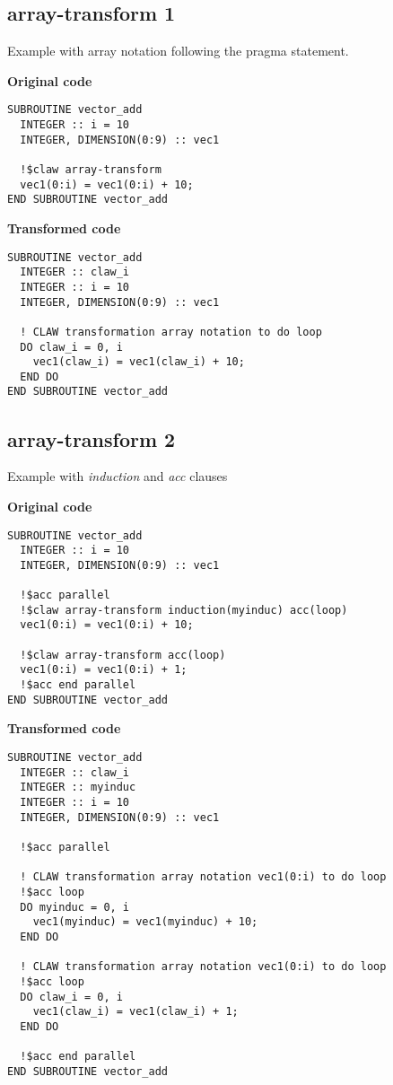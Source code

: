 \documentclass{article}
\begin{document}
\subsection{array-transform 1}
\label{array-transform1}
Example with array notation following the pragma statement. 

\textbf{Original code}
\begin{lstlisting}
SUBROUTINE vector_add
  INTEGER :: i = 10
  INTEGER, DIMENSION(0:9) :: vec1

  !$claw array-transform
  vec1(0:i) = vec1(0:i) + 10;
END SUBROUTINE vector_add
\end{lstlisting}

\textbf{Transformed code}
\begin{lstlisting}
SUBROUTINE vector_add
  INTEGER :: claw_i
  INTEGER :: i = 10
  INTEGER, DIMENSION(0:9) :: vec1

  ! CLAW transformation array notation to do loop
  DO claw_i = 0, i
    vec1(claw_i) = vec1(claw_i) + 10;
  END DO
END SUBROUTINE vector_add
\end{lstlisting}


\subsection{array-transform 2}
\label{array-transform2}
Example with \textit{induction} and \textit{acc} clauses

\textbf{Original code}
\begin{lstlisting}
SUBROUTINE vector_add
  INTEGER :: i = 10
  INTEGER, DIMENSION(0:9) :: vec1

  !$acc parallel
  !$claw array-transform induction(myinduc) acc(loop)
  vec1(0:i) = vec1(0:i) + 10;

  !$claw array-transform acc(loop)
  vec1(0:i) = vec1(0:i) + 1;
  !$acc end parallel
END SUBROUTINE vector_add
\end{lstlisting}


\textbf{Transformed code}
\begin{lstlisting}
SUBROUTINE vector_add
  INTEGER :: claw_i
  INTEGER :: myinduc
  INTEGER :: i = 10
  INTEGER, DIMENSION(0:9) :: vec1

  !$acc parallel

  ! CLAW transformation array notation vec1(0:i) to do loop
  !$acc loop
  DO myinduc = 0, i
    vec1(myinduc) = vec1(myinduc) + 10;
  END DO

  ! CLAW transformation array notation vec1(0:i) to do loop
  !$acc loop
  DO claw_i = 0, i
    vec1(claw_i) = vec1(claw_i) + 1;
  END DO
  
  !$acc end parallel
END SUBROUTINE vector_add
\end{lstlisting}
\end{document}
